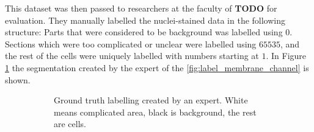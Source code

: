 \documentclass[
  digital,     %
  oneside,     %
  nosansbold,  %
  nocolorbold, %
  lof,         %
  lot,         %
]{fithesis4}
\begin{document}
This dataset was then passed to researchers at the faculty of \textbf{TODO} for
evaluation. They manually labelled the nuclei-stained data in the following
structure: Parts that were considered to be background was labelled using $0$.
Sections which were too complicated or unclear were labelled using $65535$, and
the rest of the cells were uniquely labelled with numbers starting at $1$. In
Figure \ref{fig:label_ground_truth} the segmentation created by the expert of
the \ref{fig:label_membrane_channel} is shown.

\begin{figure}
    \centering
    \begin{subfigure}[t]{0.4\textwidth}
        \centering
        \caption{Ground truth labelling created by an expert. White means
        complicated area, black is background, the rest are cells.}
        \label{fig:label_ground_truth}
    \end{subfigure}
    \hfill
    \begin{subfigure}[t]{0.4\textwidth}
        \centering

\end{subfigure}
\end{figure}
\end{document}
